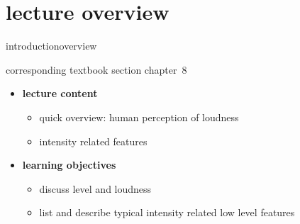 


\subtitle{module 8.0: intensity}


	

    \section[overview]{lecture overview}
        \begin{frame}{introduction}{overview}
            \begin{block}{corresponding textbook section}
                    chapter~8
            \end{block}

            \begin{itemize}
                \item   \textbf{lecture content}
                    \begin{itemize}
                        \item   quick overview: human perception of loudness 
                        \item   intensity related features
                    \end{itemize}
                \bigskip
                \item<2->   \textbf{learning objectives}
                    \begin{itemize}
                        \item   discuss level and loudness
                        \item   list and describe typical intensity related low level features
                    \end{itemize}
            \end{itemize}
        \end{frame}

